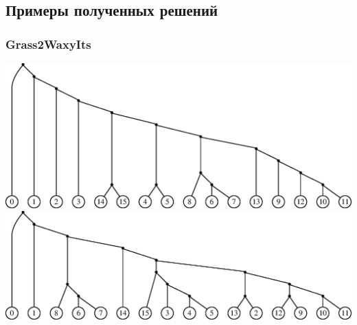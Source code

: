 \documentclass[hyperref={unicode}]{beamer}
\begin{document}
%
%

\subsection{Примеры полученных решений}

\begin{frame}
\frametitle{Grass2WaxyIts}

\centering
\includegraphics[width=0.87\linewidth]{img/Grass2WaxyIts_tree0.eps}
\\
\includegraphics[width=0.87\linewidth]{img/Grass2WaxyIts_tree1.eps}
	
\end{frame}
\end{document}
